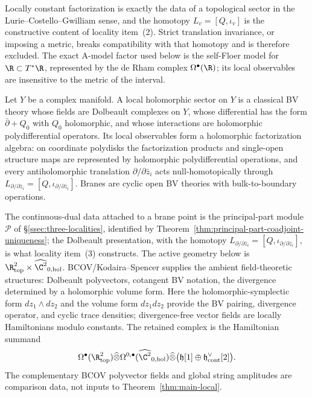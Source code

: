 \documentclass[11pt]{memoir}
\begin{document}
\begin{rmk}
  Locally constant factorization is exactly the data of a
  topological sector in the Lurie--Costello--Gwilliam sense, and the
  homotopy \(L_v=[Q,\iota_v]\) is the constructive content of
  locality item~(2).  Strict translation invariance, or imposing a
  metric, breaks compatibility with that homotopy and is therefore
  excluded.  The exact A-model factor used below is the self-Floer
  model for \(\R\subset T^*\R\), represented by the de Rham complex
  \(\Omega^\bullet(\R)\); its local observables are insensitive to
  the metric of the interval.
\end{rmk}

\begin{defn}
\label{def:local-holomorphic-string-sector}
  Let \(Y\) be a complex manifold.  A local holomorphic sector on
  \(Y\) is a classical BV theory whose fields are Dolbeault complexes
  on \(Y\), whose differential has the form
  \(\bar\partial+Q_0\) with \(Q_0\) holomorphic, and whose
  interactions are holomorphic polydifferential operators.  Its local
  observables form a holomorphic factorization algebra: on coordinate
  polydisks the factorization products and single-open structure
  maps are represented by holomorphic polydifferential operations,
  and every antiholomorphic translation
  \(\partial/\partial\bar z_i\) acts null-homotopically through
  \(L_{\partial/\partial\bar z_i}
   =[Q,\iota_{\partial/\partial\bar z_i}]\).  Branes are cyclic open
  BV theories with bulk-to-boundary operations.
\end{defn}

\begin{rmk}
  The continuous-dual data attached to a brane point is the
  principal-part module \(\mathcal P\) of \S\ref{ssec:three-localities},
  identified by Theorem~\ref{thm:principal-part-coadjoint-uniqueness};
  the Dolbeault presentation, with the homotopy
  \(L_{\partial/\partial\bar z_i}
   =[Q,\iota_{\partial/\partial\bar z_i}]\), is what locality
  item~(3) constructs.  The active geometry below is
  \(\R^2_{\mathrm{top}}\times\widehat{\C^2}_{0,\mathrm{hol}}\).
  BCOV/Kodaira--Spencer \cite{bcov} supplies the ambient field-theoretic
  structures: Dolbeault polyvectors, cotangent BV notation, the divergence
  determined by a holomorphic volume form.  Here the
  holomorphic-symplectic form \(dz_1\wedge dz_2\) and the volume form
  \(dz_1dz_2\) provide the BV pairing, divergence operator, and cyclic
  trace densities; divergence-free vector fields are locally
  Hamiltonians modulo constants.  The retained complex is the
  Hamiltonian summand
  \[
    \Omega^\bullet(\R^2_{\mathrm{top}})
    \widehat\otimes
    \Omega^{0,\bullet}(\widehat{\C^2}_{0,\mathrm{hol}})
    \widehat\otimes
    \bigl(\mathfrak h[1]\oplus
    \mathfrak h^\vee_{\mathrm{cont}}[2]\bigr).
  \]
  The complementary BCOV polyvector fields and global string
  amplitudes are comparison data, not inputs to
  Theorem~\ref{thm:main-local}.
\end{rmk}
\end{document}
